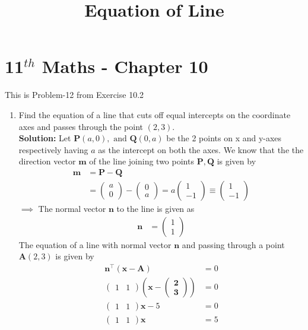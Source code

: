 \documentclass[12pt]{article}
\providecommand{\brak}[1]{\ensuremath{\left(#1\right)}}
\newcommand{\solution}{\noindent \textbf{Solution: }}
\newcommand{\myvec}[1]{\ensuremath{\begin{pmatrix}#1\end{pmatrix}}}
\let\vec\mathbf
\begin{document}
\begin{center}
\title{\textbf{Equation  of Line}}
\date{\vspace{-5ex}} %
\maketitle
\end{center}
\setcounter{page}{1}

\section{11$^{th}$ Maths - Chapter 10}
This is Problem-12 from Exercise 10.2
\begin{enumerate}
\item Find the equation of a line that cuts off equal intercepts on the coordinate axes and passes through the point $(2,3)$. \\ 
\solution 
Let $\vec{P}(a,0), \text{ and } \vec{Q}(0,a)$ be the 2 points on x and y-axes respectively having $a$ as the intercept on both the axes. We know that the the direction vector $\vec{m}$ of the line joining two points $\vec{P}, \vec{Q}$ is given by  
\begin{align}
\vec{m} &=   \vec{P} - \vec{Q} \\
        &=   \myvec{
		a \\
		0 
		} - \myvec{
		   0 \\
		   a
		}  = a\myvec{ 
                     1 \\
		   -1 
        		}  \equiv \myvec{
                           1 \\
			   -1 
		         } 
\end{align}
$\implies$ The normal vector $\vec{n}$ to the line is given as
\begin{align}
\vec{n} &=  \myvec{
		     1 \\
		     1
	     } 
\end{align}
The equation of a line with normal vector $\vec{n}$ and passing through a point $\vec{A}(2,3)$ is given by
\begin{align}
	\vec{n}^\top\brak{\vec{x}-\vec{A}} &= 0 \\
	\myvec { 1 & 1 } \brak{ \vec{ x  - \myvec{ 2 \\
                                   3
			     }
		}}  &= 0  \\
	\myvec{ 1 & 1} \vec{x} -5 &= 0 \\
        \label{eq:1}
	\myvec{ 1 & 1} \vec{x}  &= 5 
\end{align}

\end{enumerate}
\end{document}
